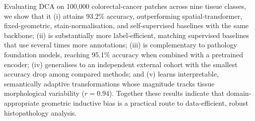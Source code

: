 Evaluating DCA on 100{,}000 colorectal-cancer patches across nine tissue classes,
we show that it (i) attains 93.2\% accuracy, outperforming spatial-transformer,
fixed-geometric, stain-normalisation, and self-supervised baselines with the same
backbone; (ii) is substantially more label-efficient, matching supervised
baselines that use several times more annotations; (iii) is complementary to
pathology foundation models, reaching 95.1\% accuracy when combined with a
pretrained encoder; (iv) generalises to an independent external cohort with the
smallest accuracy drop among compared methods; and (v) learns interpretable,
semantically adaptive transformations whose magnitude tracks tissue morphological
variability ($r=0.94$). Together these results indicate that domain-appropriate
geometric inductive bias is a practical route to data-efficient, robust
histopathology analysis.
